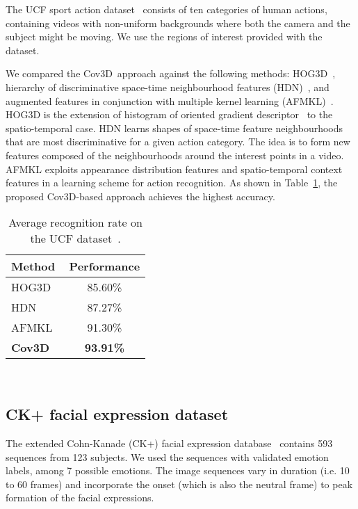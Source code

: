 \documentclass[10pt,twocolumn,letterpaper]{article}
\newcommand{\cov}{{Cov3D}}
\begin{document}
The UCF sport action dataset~\cite{RodriguezEtAl2008} consists of ten categories of human actions,
containing videos with non-uniform backgrounds where both the camera and the subject might be moving.
We use the regions of interest provided with the dataset.

We compared the \cov~approach against the following methods:
HOG3D~\cite{WangEtAl2009},
hierarchy of discriminative space-time neighbourhood features (HDN)~\cite{KovashkaAndGrauman2010},
and augmented features in conjunction with multiple kernel learning (AFMKL)~\cite{WuEtAl2011}.
HOG3D is the extension of histogram of oriented gradient descriptor~\cite{LaptevEtAl2008} to the spatio-temporal case.
HDN learns shapes of space-time feature neighbourhoods that are most discriminative for a given action category.
The idea is to form new features composed of the neighbourhoods around the interest points in a video.
AFMKL exploits appearance distribution features and spatio-temporal context features in a learning scheme for action recognition.
As shown in Table~\ref{tab:ucf_rates}, the proposed \cov-based approach achieves the highest accuracy.

\begin{table}[!tb]
  \centering
  \footnotesize
  \begin{tabular}{lc}
    \toprule
    \bf{Method}                       &\bf{Performance}\\
    \midrule[\heavyrulewidth]
    HOG3D~\cite{WangEtAl2009}         &85.60\%\\
    HDN~\cite{KovashkaAndGrauman2010} &87.27\%\\
    AFMKL~\cite{WuEtAl2011}           &91.30\%\\
    \bf{\cov}                         &\bf{93.91\%}\\
    \bottomrule
  \end{tabular}
  
  ~
  
  \caption
    {
    \small
    Average recognition rate on the UCF dataset~\cite{RodriguezEtAl2008}.
    }
  \label{tab:ucf_rates}
\end{table}



\subsection{CK+ facial expression dataset}


The extended Cohn-Kanade (CK+) facial expression database~\cite{LuceyEtAl2010} contains 593 sequences from 123 subjects.
We used the sequences with validated emotion labels, among 7 possible emotions.
The image sequences vary in duration (i.e. 10 to 60 frames)
and incorporate the onset (which is also the neutral frame) to peak formation of the facial expressions.
\end{document}
